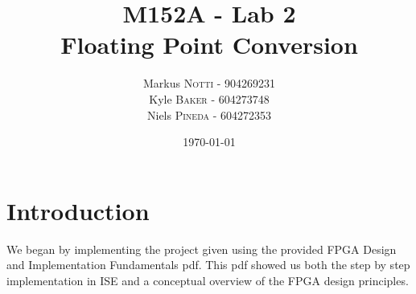 \documentclass{article}
\title{M152A - Lab 2 \\ Floating Point Conversion} %
\author{Markus \textsc{Notti} - 904269231 \\ Kyle \textsc{Baker}  - 604273748 \\ Niels \textsc{Pineda} - 604272353} %
\date{\today} %
\begin{document}
\maketitle %


\section*{Introduction}

We began by implementing the project given using the provided FPGA Design and Implementation Fundamentals pdf.  This pdf showed us both the step by step implementation in ISE and a conceptual overview of the FPGA design principles.  
\end{document}
